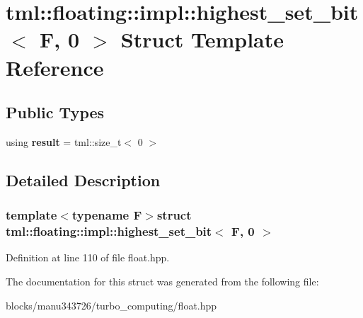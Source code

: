 \hypertarget{structtml_1_1floating_1_1impl_1_1highest__set__bit_3_01_f_00_010_01_4}{\section{tml\+:\+:floating\+:\+:impl\+:\+:highest\+\_\+set\+\_\+bit$<$ F, 0 $>$ Struct Template Reference}
\label{structtml_1_1floating_1_1impl_1_1highest__set__bit_3_01_f_00_010_01_4}
}
\subsection*{Public Types}
\begin{DoxyCompactItemize}
\item 
\hypertarget{structtml_1_1floating_1_1impl_1_1highest__set__bit_3_01_f_00_010_01_4_ad039a7085f81eb58b9673976f3924d33}{using {\bfseries result} = tml\+::size\+\_\+t$<$ 0 $>$}\label{structtml_1_1floating_1_1impl_1_1highest__set__bit_3_01_f_00_010_01_4_ad039a7085f81eb58b9673976f3924d33}

\end{DoxyCompactItemize}


\subsection{Detailed Description}
\subsubsection*{template$<$typename F$>$struct tml\+::floating\+::impl\+::highest\+\_\+set\+\_\+bit$<$ F, 0 $>$}



Definition at line 110 of file float.\+hpp.



The documentation for this struct was generated from the following file\+:\begin{DoxyCompactItemize}
\item 
blocks/manu343726/turbo\+\_\+computing/float.\+hpp\end{DoxyCompactItemize}
